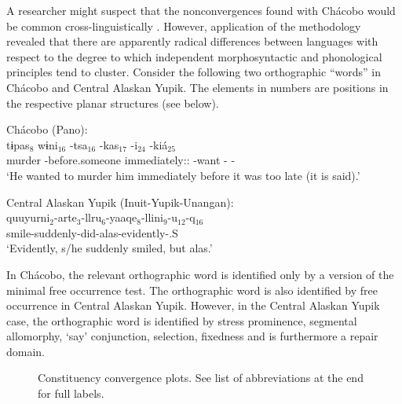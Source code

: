 \documentclass[output=paper,hidelinks]{langscibook}
\begin{document}
A researcher might suspect that the nonconvergences found with Chácobo would be common cross-linguistically \citep{Bickel2017}. However, application of the methodology revealed that there are apparently radical differences between languages with respect to the degree to which independent morphosyntactic and phonological principles tend to cluster. Consider the following two orthographic ``words'' in Chácobo and Central Alaskan Yupik. The elements in numbers are positions in the respective planar structures (see below).

\ea \label{ex:chacobo4}
    Chácobo (Pano): \\
    \gll tɨpas$_8$ wɨni$_{16}$ -tsa$_{16}$ -kas$_{17}$ -i$_{24}$ -kiá$_{25}$  \\
    murder -before.someone immediately:\Itr{}:\Sg{} -want -\Decl{} -\Rep{} \\
    \glt `He wanted to murder him immediately before it was too late (it is said).’  
    \citep[54]{tallman2017nahuapaxahua}
\z 

\ea \label{ex:cupik1}
    Central Alaskan Yupik (Inuit-Yupik-Unangan): \\
    \gll quuyurni$_2$-arte$_3$-llru$_6$-yaaqe$_8$-llini$_9$-u$_{12}$-q$_{16}$  \\
    smile-suddenly-did-alas-evidently\Ind{}-\Third{}\Sg{}.S \\
    \glt `Evidently, s/he suddenly smiled, but alas.' \citep[85]{Woodbury2002}
\z 

In Chácobo, the relevant orthographic word is identified only by a version of the minimal free occurrence test. The orthographic word is also identified by free occurrence in Central Alaskan Yupik. However, in the Central Alaskan Yupik case, the orthographic word is identified by stress prominence, segmental allomorphy, `say' conjunction, selection, fixedness and is furthermore a repair domain.

\begin{figure}
    \caption{Constituency convergence plots. See list of abbreviations at the end for full labels.}
\end{figure}
\end{document}
